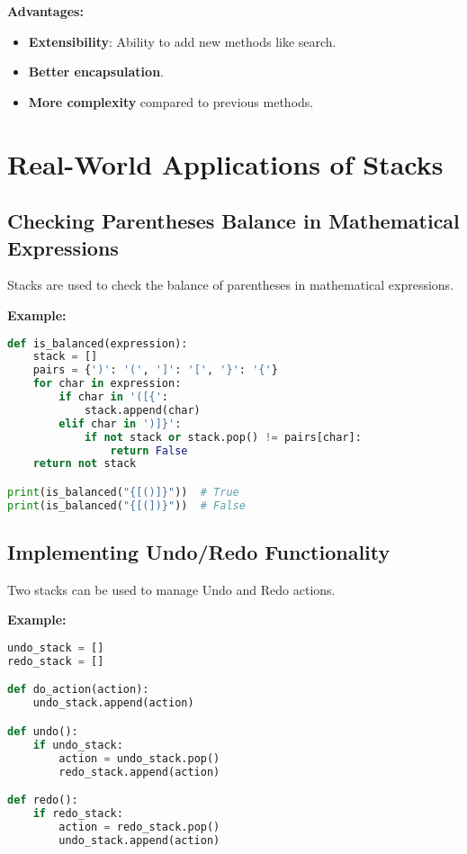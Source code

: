 \documentclass{article}
\begin{document}
\textbf{Advantages:}

\begin{itemize}
    \item \textbf{Extensibility}: Ability to add new methods like search.
    \item \textbf{Better encapsulation}.
    \item \textbf{More complexity} compared to previous methods.
\end{itemize}

\section{Real-World Applications of Stacks}

\subsection{Checking Parentheses Balance in Mathematical Expressions}

Stacks are used to check the balance of parentheses in mathematical expressions.

\textbf{Example:}

\begin{lstlisting}[language=Python]
def is_balanced(expression):
    stack = []
    pairs = {')': '(', ']': '[', '}': '{'}
    for char in expression:
        if char in '([{':
            stack.append(char)
        elif char in ')]}':
            if not stack or stack.pop() != pairs[char]:
                return False
    return not stack

print(is_balanced("{[()]}"))  # True
print(is_balanced("{[(])}"))  # False
\end{lstlisting}

\subsection{Implementing Undo/Redo Functionality}

Two stacks can be used to manage Undo and Redo actions.

\textbf{Example:}

\begin{lstlisting}[language=Python]
undo_stack = []
redo_stack = []

def do_action(action):
    undo_stack.append(action)

def undo():
    if undo_stack:
        action = undo_stack.pop()
        redo_stack.append(action)

def redo():
    if redo_stack:
        action = redo_stack.pop()
        undo_stack.append(action)
\end{lstlisting}
\end{document}
